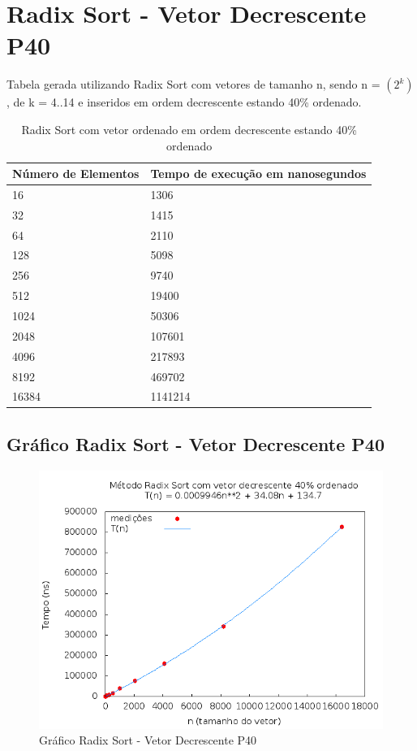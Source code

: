 \documentclass[12pt,a4paper,twoside]{report}
\begin{document}
\section{Radix Sort - Vetor Decrescente P40}
Tabela gerada utilizando Radix Sort com vetores de tamanho n, sendo n = $(2^k)$, de k = 4..14 e inseridos em ordem decrescente estando 40\% ordenado.
\begin{table}[H]
\centering
\caption{Radix Sort com vetor ordenado em ordem decrescente estando 40\% ordenado}
\label{my-label}
\begin{tabular}{|l|l|}
\hline
\multicolumn{1}{|c|}{\textbf{Número de Elementos}} & \multicolumn{1}{c|}{\textbf{Tempo de execução em nanosegundos}} \\ \hline
16 & 1306 \\ \hline
32 & 1415 \\ \hline
64 & 2110 \\ \hline
128 & 5098 \\ \hline
256 & 9740 \\ \hline
512 & 19400 \\ \hline
1024 & 50306 \\ \hline
2048 & 107601 \\ \hline
4096 & 217893 \\ \hline
8192 & 469702 \\ \hline
16384 & 1141214 \\ \hline
\end{tabular}
\end{table}

\subsection{Gráfico Radix Sort - Vetor Decrescente P40}
\begin{figure}[H]
    \centering
    \includegraphics[width=0.7\linewidth]{graficos/RadixSort/vIntDecrescenteP40/vIntDecrescenteP40.png}
  \caption{Gráfico Radix Sort - Vetor Decrescente P40}
\end{figure}
\end{document}
